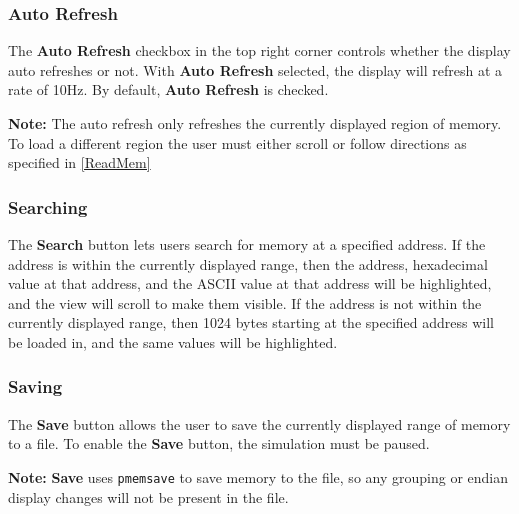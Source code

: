\documentclass{article}
\newcommand{\code}[1]{\texttt{#1}}
\begin{document}
\subsubsection{Auto Refresh}
The \textbf{Auto Refresh} checkbox in the top right corner controls whether the display auto refreshes or not. With \textbf{Auto Refresh} selected, the display will refresh at a rate of 10Hz. By default, \textbf{Auto Refresh} is checked.\par
\textbf{Note:} The auto refresh only refreshes the currently displayed region of memory. To load a different region the user must either scroll or follow directions as specified in \ref{ReadMem}

\subsubsection{Searching}
The \textbf{Search} button lets users search for memory at a specified address. If the address is within the currently displayed range, then the address, hexadecimal value at that address, and the ASCII value at that address will be highlighted, and the view will scroll to make them visible. If the address is not within the currently displayed range, then 1024 bytes starting at the specified address will be loaded in, and the same values will be highlighted.

\subsubsection{Saving}
The \textbf{Save} button allows the user to save the currently displayed range of memory to a file. To enable the \textbf{Save} button, the simulation must be paused.\par
\textbf{Note:} \textbf{Save} uses \code{pmemsave} to save memory to the file, so any grouping or endian display changes will not be present in the file.
\end{document}
